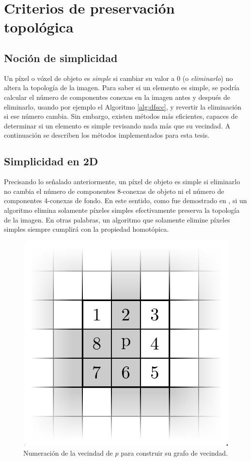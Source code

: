 \section{Criterios de preservación topológica}

\subsection{Noción de simplicidad}

Un píxel o vóxel de objeto es \textit{simple} si cambiar su valor a 0 (o \textit{eliminarlo}) no altera la topología de la imagen. Para saber si un elemento es simple, se podría calcular el número de componentes conexas en la imagen antes y después de eliminarlo, usando por ejemplo el Algoritmo \ref{alg:dfscc}, y revertir la eliminación si ese número cambia. Sin embargo, existen métodos más eficientes, capaces de determinar si un elemento es simple revisando nada más que su vecindad. A continuación se describen los métodos implementados para esta tesis.

\subsection{Simplicidad en 2D}

Precisando lo señalado anteriormente, un píxel de objeto es simple si eliminarlo no cambia el número de componentes 8-conexas de objeto ni el número de componentes 4-conexas de fondo. En este sentido, como fue demostrado en \cite{stefanelli1971some}, si un algoritmo elimina solamente píxeles simples efectivamente preserva la topología de la imagen. En otras palabras, un algoritmo que solamente elimine píxeles simples siempre cumplirá con la propiedad homotópica.

\begin{figure}[ht]\centering
\includegraphics[width=0.35\linewidth]{images/2dsimpletestimageextract}
\caption{Numeración de la vecindad de $p$ para construir su grafo de vecindad.}
\label{fig:2dsimplen8}
\end{figure}

